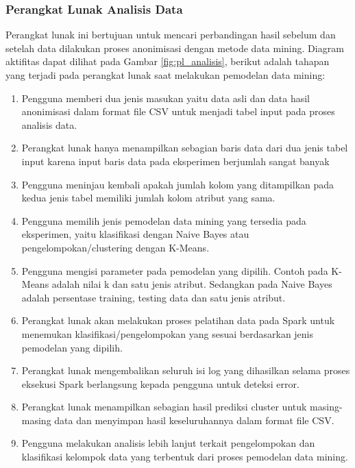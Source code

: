 \subsubsection{Perangkat Lunak Analisis Data}
Perangkat lunak ini bertujuan untuk mencari perbandingan hasil sebelum dan setelah data dilakukan proses anonimisasi dengan metode data mining. Diagram aktifitas dapat dilihat pada Gambar \ref{fig:pl_analisis}, berikut adalah tahapan yang terjadi pada perangkat lunak saat melakukan pemodelan data mining:

\begin{enumerate}

\item Pengguna memberi dua jenis masukan yaitu data asli dan data hasil anonimisasi dalam format file CSV untuk menjadi tabel input pada proses analisis data.

\item Perangkat lunak hanya menampilkan sebagian baris data dari dua jenis tabel input karena input baris data pada eksperimen berjumlah sangat banyak 

\item Pengguna meninjau kembali apakah jumlah kolom yang ditampilkan pada kedua jenis tabel memiliki jumlah kolom atribut yang sama.

\item Pengguna memilih jenis pemodelan data mining yang tersedia pada eksperimen, yaitu klasifikasi dengan Naive Bayes atau pengelompokan/clustering dengan K-Means. 

\item Pengguna mengisi parameter pada pemodelan yang dipilih. Contoh pada K-Means adalah nilai k dan satu jenis atribut. Sedangkan pada Naive Bayes adalah persentase training, testing data dan satu jenis atribut.

\item Perangkat lunak akan melakukan proses pelatihan data pada Spark untuk menemukan klasifikasi/pengelompokan yang sesuai berdasarkan jenis pemodelan yang dipilih.

\item Perangkat lunak mengembalikan seluruh isi log yang dihasilkan selama proses eksekusi Spark berlangsung kepada pengguna untuk deteksi error.

\item Perangkat lunak menampilkan sebagian hasil prediksi cluster untuk masing-masing data dan menyimpan hasil keseluruhannya dalam format file CSV.

\item Pengguna melakukan analisis lebih lanjut terkait pengelompokan dan klasifikasi kelompok data yang terbentuk dari proses pemodelan data mining.
\end{enumerate}

